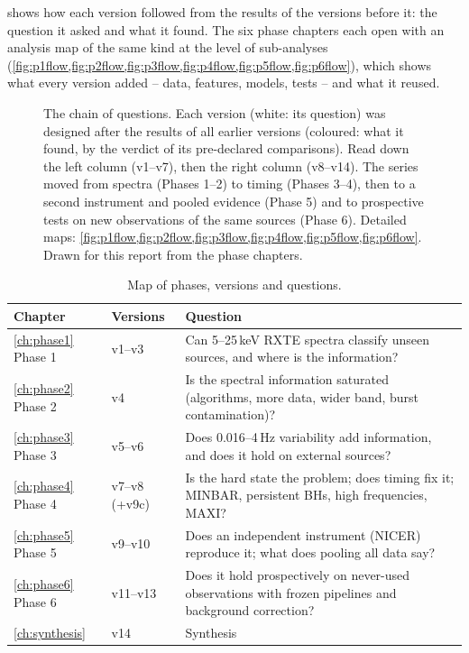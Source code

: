  shows how each version followed from the results of the versions before it: the question it asked
and what it found. The six phase chapters each open with an analysis map of the same kind at the level of sub-analyses
(\cref{fig:p1flow,fig:p2flow,fig:p3flow,fig:p4flow,fig:p5flow,fig:p6flow}), which shows what every version added -- data,
features, models, tests -- and what it reused.

\begin{figure}[p]
\centering

\caption[The chain of questions, v1--v14]{The chain of questions. Each version (white: its question) was designed after the
results of all earlier versions (coloured: what it found, by the verdict of its pre-declared comparisons). Read down the left
column (v1--v7), then the right column (v8--v14). The series moved from spectra (Phases 1--2) to timing (Phases 3--4), then to a
second instrument and pooled evidence (Phase 5) and to prospective tests on new observations of the same sources (Phase 6).
Detailed maps: \cref{fig:p1flow,fig:p2flow,fig:p3flow,fig:p4flow,fig:p5flow,fig:p6flow}. Drawn for this report from the phase
chapters.}
\label{fig:questionchain}
\end{figure}

\begin{table}[htbp]
\centering\small
\caption[Map of phases, versions and questions]{Map of phases, versions and questions.}\label{tab:phasemap}
\begin{tabularx}{\textwidth}{@{}lp{1.4cm}X@{}}
\toprule
Chapter & Versions & Question \\
\midrule
\ref{ch:phase1} Phase 1 & v1--v3 & Can 5--25\,keV RXTE spectra classify unseen sources, and where is the information? \\
\ref{ch:phase2} Phase 2 & v4 & Is the spectral information saturated (algorithms, more data, wider band, burst contamination)? \\
\ref{ch:phase3} Phase 3 & v5--v6 & Does 0.016--4\,Hz variability add information, and does it hold on external sources? \\
\ref{ch:phase4} Phase 4 & v7--v8 (+v9c) & Is the hard state the problem; does timing fix it; MINBAR, persistent BHs, high frequencies, MAXI? \\
\ref{ch:phase5} Phase 5 & v9--v10 & Does an independent instrument (NICER) reproduce it; what does pooling all data say? \\
\ref{ch:phase6} Phase 6 & v11--v13 & Does it hold prospectively on never-used observations with frozen pipelines and background correction? \\
\ref{ch:synthesis} & v14 & Synthesis \\
\bottomrule
\end{tabularx}
\end{table}
